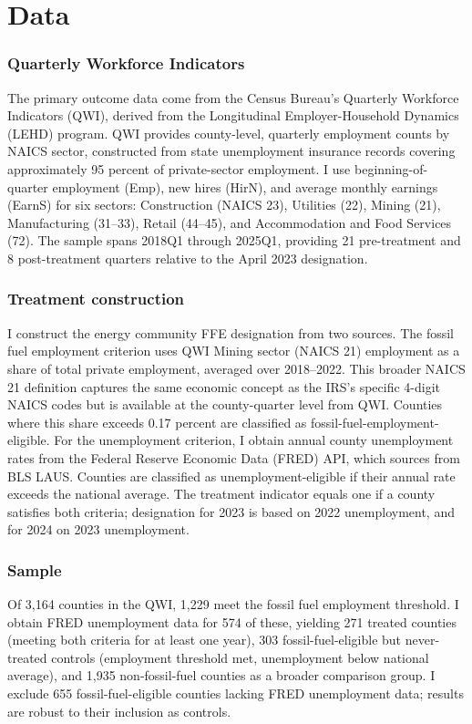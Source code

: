 \documentclass[12pt]{article}
\begin{document}
\section{Data}
\label{sec:data}

\subsubsection*{Quarterly Workforce Indicators}
The primary outcome data come from the Census Bureau's Quarterly Workforce Indicators (QWI), derived from the Longitudinal Employer-Household Dynamics (LEHD) program. QWI provides county-level, quarterly employment counts by NAICS sector, constructed from state unemployment insurance records covering approximately 95 percent of private-sector employment. I use beginning-of-quarter employment (Emp), new hires (HirN), and average monthly earnings (EarnS) for six sectors: Construction (NAICS 23), Utilities (22), Mining (21), Manufacturing (31--33), Retail (44--45), and Accommodation and Food Services (72). The sample spans 2018Q1 through 2025Q1, providing 21 pre-treatment and 8 post-treatment quarters relative to the April 2023 designation.

\subsubsection*{Treatment construction}
I construct the energy community FFE designation from two sources. The fossil fuel employment criterion uses QWI Mining sector (NAICS 21) employment as a share of total private employment, averaged over 2018--2022. This broader NAICS 21 definition captures the same economic concept as the IRS's specific 4-digit NAICS codes but is available at the county-quarter level from QWI. Counties where this share exceeds 0.17 percent are classified as fossil-fuel-employment-eligible. For the unemployment criterion, I obtain annual county unemployment rates from the Federal Reserve Economic Data (FRED) API, which sources from BLS LAUS. Counties are classified as unemployment-eligible if their annual rate exceeds the national average. The treatment indicator equals one if a county satisfies both criteria; designation for 2023 is based on 2022 unemployment, and for 2024 on 2023 unemployment.

\subsubsection*{Sample}
Of 3,164 counties in the QWI, 1,229 meet the fossil fuel employment threshold. I obtain FRED unemployment data for 574 of these, yielding 271 treated counties (meeting both criteria for at least one year), 303 fossil-fuel-eligible but never-treated controls (employment threshold met, unemployment below national average), and 1,935 non-fossil-fuel counties as a broader comparison group. I exclude 655 fossil-fuel-eligible counties lacking FRED unemployment data; results are robust to their inclusion as controls.
\end{document}
